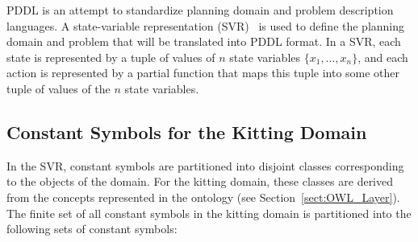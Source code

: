 PDDL is an attempt to standardize planning domain and problem description languages. A state-variable representation (SVR)~\cite{NAU.2004} is used to define the planning domain and problem that will be translated into PDDL format. In a SVR, each state is represented by a tuple of values of $n$ state variables $\lbrace x_1,\dots,x_n\rbrace$, and each action is represented by a partial function that maps this tuple into some other tuple of values of the $n$ state variables.

\subsection{Constant Symbols for the Kitting Domain}
In the SVR, constant symbols are partitioned into disjoint classes corresponding to the objects of the domain. For the kitting domain, these classes are derived from the concepts represented in the ontology (see Section~\ref{sect:OWL_Layer}). The finite set of all constant symbols in the kitting domain is partitioned into the following sets of constant symbols:
